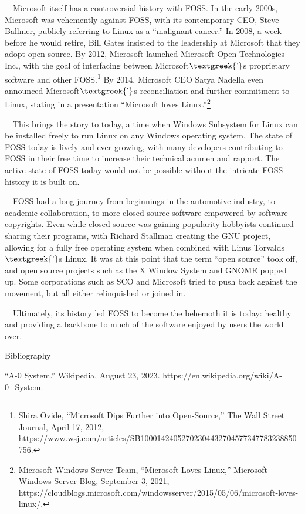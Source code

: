 \documentclass{article}
\begin{document}
\ \ Microsoft itself has a controversial history with FOSS. In the early 2000s, Microsoft was vehemently against FOSS,
with its contemporary CEO, Steve Ballmer, publicly referring to Linux as a “malignant cancer.” In 2008, a week before
he would retire, Bill Gates insisted to the leadership at Microsoft that they adopt open source. By 2012, Microsoft
launched Microsoft Open Technologies Inc., with the goal of interfacing between Microsoft$\text{\textgreek{’}}$s
proprietary software and other FOSS.\footnote{Shira Ovide, “Microsoft Dips Further into Open-Source,” The Wall Street
Journal, April 17, 2012, https://www.wsj.com/articles/SB10001424052702304432704577347783238850756.} By 2014, Microsoft
CEO Satya Nadella even announced Microsoft$\text{\textgreek{’}}$s reconciliation and further commitment to Linux,
stating in a presentation “Microsoft loves Linux.”\footnote{Microsoft Windows Server Team, “Microsoft Loves Linux,”
Microsoft Windows Server Blog, September 3, 2021,
https://cloudblogs.microsoft.com/windowsserver/2015/05/06/microsoft-loves-linux/.}

\ \ This brings the story to today, a time when Windows Subsystem for Linux can be installed freely to run Linux on any
Windows operating system. The state of FOSS today is lively and ever-growing, with many developers contributing to FOSS
in their free time to increase their technical acumen and rapport. The active state of FOSS today would not be possible
without the intricate FOSS history it is built on. 

\ \ FOSS had a long journey from beginnings in the automotive industry, to academic collaboration, to more closed-source
software empowered by software copyrights. Even while closed-source was gaining popularity hobbyists continued sharing
their programs, with Richard Stallman creating the GNU project, allowing for a fully free operating system when
combined with Linus Torvalds$\text{\textgreek{’}}$s Linux. It was at this point that the term “open source” took off,
and open source projects such as the X Window System and GNOME popped up. Some corporations such as SCO and Microsoft
tried to push back against the movement, but all either relinquished or joined in. 

\ \ Ultimately, its history led FOSS to become the behemoth it is today: healthy and providing a backbone to much of the
software enjoyed by users the world over.

\clearpage
Bibliography

“A-0 System.” Wikipedia, August 23, 2023. https://en.wikipedia.org/wiki/A-0\_System. 
\end{document}
